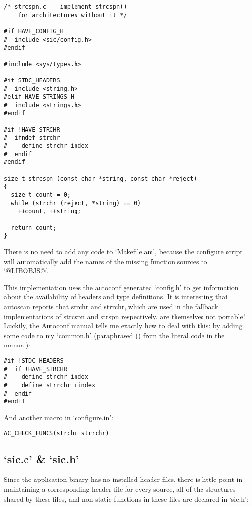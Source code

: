 \begin{Verbatim}[frame=single]
/* strcspn.c -- implement strcspn() 
    for architectures without it */

#if HAVE_CONFIG_H
#  include <sic/config.h>
#endif

#include <sys/types.h>

#if STDC_HEADERS
#  include <string.h>
#elif HAVE_STRINGS_H
#  include <strings.h>
#endif

#if !HAVE_STRCHR
#  ifndef strchr
#    define strchr index
#  endif
#endif

size_t strcspn (const char *string, const char *reject)
{
  size_t count = 0;
  while (strchr (reject, *string) == 0)
    ++count, ++string;

  return count;
}
\end{Verbatim}

There is no need to add any code to `Makefile.am', because the configure script
will automatically add the names of the missing function sources to `@LIBOBJS@'. 


This implementation uses the autoconf generated `config.h' to get information about the availability of headers and type definitions. It is interesting that autoscan reports that strchr and strrchr, which are used in the fallback implementations of strcspn and strspn respectively, are themselves not portable! Luckily, the Autoconf manual tells me exactly how to deal with this: by adding some code to my `common.h' (paraphrased ({\MbQ{}}) from the literal code in the manual): 

\begin{Verbatim}[frame=single]
#if !STDC_HEADERS
#  if !HAVE_STRCHR
#    define strchr index
#    define strrchr rindex
#  endif
#endif
\end{Verbatim}

And another macro in `configure.in': 

\begin{Verbatim}[frame=single]
AC_CHECK_FUNCS(strchr strrchr)
\end{Verbatim}

\subsection{`sic.c' \& `sic.h'}


Since the application binary has no installed header files, there is little point in maintaining a corresponding header file for every source, all of the structures shared by these files, and non-static functions in these files are declared in `sic.h': 

